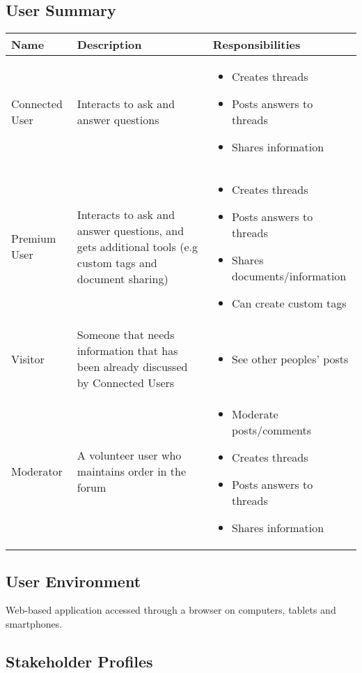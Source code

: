 \documentclass [a4paper, 12pt] {article}
\begin{document}
\subsection{User Summary}
\begin{tabular}{| M{2.5cm} | M{5.5cm} | M{6cm} |}
	\hline
	Name & Description & Responsibilities \tabularnewline
	\hline \hline
	Connected User & Interacts to ask and answer questions &
	\begin{itemize}
		\item Creates threads
		\item Posts answers to threads
		\item Shares information
	\end{itemize}
	\tabularnewline
	\hline
	Premium User & Interacts to ask and answer questions, and gets additional tools (e.g custom tags and document sharing) &
	\begin{itemize}
		\item Creates threads
		\item Posts answers to threads
		\item Shares documents/information
		\item Can create custom tags
	\end{itemize} \tabularnewline
	\hline
	Visitor & Someone that needs information that has been already discussed by Connected Users &
	\begin{itemize}
		\item See other peoples' posts
	\end{itemize} \tabularnewline
	\hline
	Moderator & A volunteer user who maintains order in the forum &
	\begin{itemize}
		\item Moderate posts/comments
		\item Creates threads
		\item Posts answers to threads
		\item Shares information
	\end{itemize} \tabularnewline
	\hline
\end{tabular}

\subsection{User Environment}
Web-based application accessed through a browser on computers, tablets and smartphones.

\subsection{Stakeholder Profiles}
\end{document}
